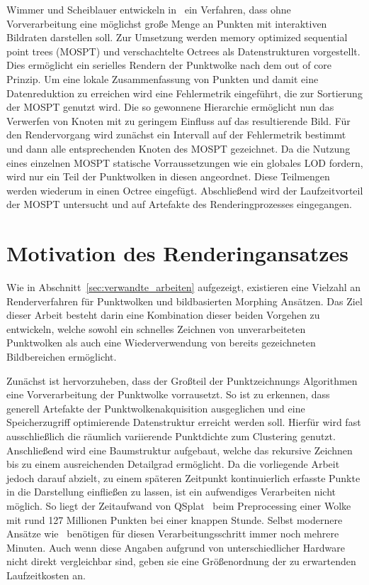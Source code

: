 \documentclass[hyperref, beleg, german]{cgvpub}
\begin{document}
Wimmer und Scheiblauer entwickeln in~\cite{wimmer2006instant} ein Verfahren,
dass ohne Vorverarbeitung eine möglichst große Menge an Punkten mit
interaktiven Bildraten darstellen soll. Zur Umsetzung werden memory optimized
sequential point trees (MOSPT) und verschachtelte Octrees als Datenstrukturen
vorgestellt. Dies ermöglicht ein serielles Rendern der Punktwolke nach dem out
of core Prinzip. Um eine lokale Zusammenfassung von Punkten und damit eine
Datenreduktion zu erreichen wird eine Fehlermetrik eingeführt, die zur
Sortierung der MOSPT genutzt wird. Die so gewonnene Hierarchie ermöglicht nun
das Verwerfen von Knoten mit zu geringem Einfluss auf das resultierende Bild.
Für den Rendervorgang wird zunächst ein Intervall auf der Fehlermetrik bestimmt
und dann alle entsprechenden Knoten des MOSPT gezeichnet. Da die Nutzung eines
einzelnen MOSPT statische Vorraussetzungen wie ein globales LOD fordern, wird
nur ein Teil der Punktwolken in diesen angeordnet. Diese Teilmengen werden
wiederum in einen Octree eingefügt. Abschließend wird der Laufzeitvorteil der
MOSPT untersucht und auf Artefakte des Renderingprozesses eingegangen.

\section{Motivation des Renderingansatzes}

Wie in Abschnitt~\ref{sec:verwandte_arbeiten} aufgezeigt, existieren eine
Vielzahl an Renderverfahren für Punktwolken und bildbasierten Morphing
Ansätzen. Das Ziel dieser Arbeit besteht darin eine Kombination dieser beiden
Vorgehen zu entwickeln, welche sowohl ein schnelles Zeichnen von
unverarbeiteten Punktwolken als auch eine Wiederverwendung von bereits
gezeichneten Bildbereichen ermöglicht.

Zunächst ist hervorzuheben, dass der Großteil der Punktzeichnungs Algorithmen
eine Vorverarbeitung der Punktwolke vorrausetzt. So ist zu erkennen, dass
generell Artefakte der Punktwolkenakquisition ausgeglichen und eine
Speicherzugriff optimierende Datenstruktur erreicht werden soll. Hierfür wird
fast ausschließlich die räumlich variierende Punktdichte zum Clustering
genutzt. Anschließend wird eine Baumstruktur aufgebaut, welche das rekursive
Zeichnen bis zu einem ausreichenden Detailgrad ermöglicht. Da die vorliegende
Arbeit jedoch darauf abzielt, zu einem späteren Zeitpunkt kontinuierlich
erfasste Punkte in die Darstellung einfließen zu lassen, ist ein aufwendiges
Verarbeiten nicht möglich. So liegt der Zeitaufwand von
QSplat~\cite{rusinkiewicz2000qsplat} beim Preprocessing einer Wolke mit rund
127 Millionen Punkten bei einer knappen Stunde. Selbst modernere Ansätze
wie~\cite{goswami2010high} benötigen für diesen Verarbeitungsschritt immer noch
mehrere Minuten. Auch wenn diese Angaben aufgrund von unterschiedlicher
Hardware nicht direkt vergleichbar sind, geben sie eine Größenordnung der zu
erwartenden Laufzeitkosten an.
\end{document}
